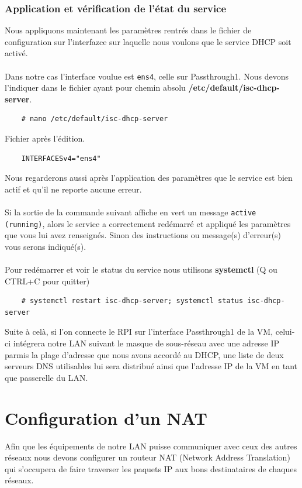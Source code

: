 \documentclass[a4paper]{article}
\begin{document}
\subsubsection{Application et vérification de l'état du service}
Nous appliquons maintenant les paramètres rentrés dans le fichier de configuration sur l'interfazce sur laquelle nous voulons que le service DHCP soit activé.\\\\Dans notre cas l'interface voulue est \verb|ens4|, celle sur Passthrough1. Nous devons l'indiquer dans le fichier ayant pour chemin absolu \textbf{/etc/default/isc-dhcp-server}.
\begin{lstlisting}
    # nano /etc/default/isc-dhcp-server
\end{lstlisting}
Fichier après l'édition.
\begin{lstlisting}
    INTERFACESv4="ens4"
\end{lstlisting}
Nous regarderons aussi après l'application des paramètres que le service est bien actif et qu'il ne reporte aucune erreur.\\\\Si la sortie de la commande suivant affiche en vert un message \verb|active (running)|, alors le service a correctement redémarré et appliqué les paramètres que vous lui avez renseignés. Sinon des instructions ou message(s) d'erreur(s) vous serons indiqué(s).\\\\Pour redémarrer et voir le status du service nous utilisons \textbf{systemctl} (Q ou CTRL+C pour quitter)
\begin{lstlisting}
    # systemctl restart isc-dhcp-server; systemctl status isc-dhcp-server
\end{lstlisting}
Suite à celà, si l'on connecte le RPI sur l'interface Passthrough1 de la VM, celui-ci intégrera notre LAN suivant le masque de sous-réseau avec une adresse IP parmis la plage d'adresse que nous avons accordé au DHCP, une liste de deux serveurs DNS utilisables lui sera distribué ainsi que l'adresse IP de la VM en tant que passerelle du LAN.
\section{Configuration d'un NAT}
Afin que les équipements de notre LAN puisse communiquer avec ceux des autres réseaux nous devons configurer un routeur NAT (Network Address Translation) qui s'occupera de faire traverser les paquets IP aux bons destinataires de chaques réseaux.
\end{document}
